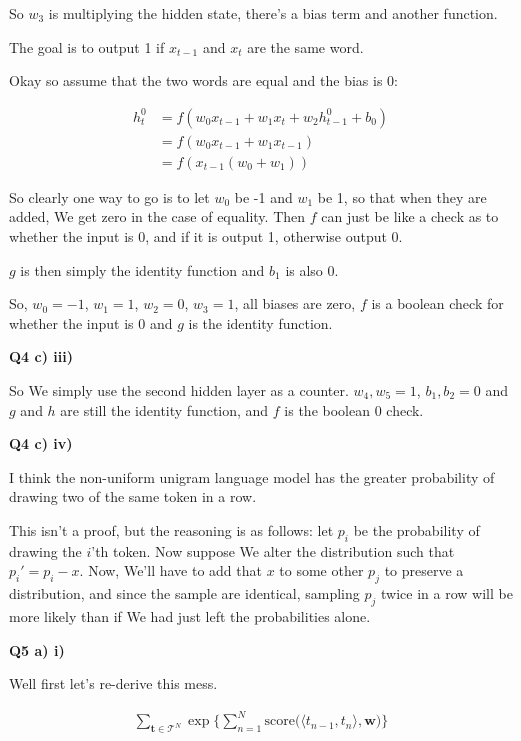 \documentclass{article}
\begin{document}
	So $w_3$ is multiplying the hidden state, there's a bias  term and another function. 
	
	The goal is to output 1 if $x_{t-1}$ and $x_t$ are the same word.
	
	Okay so assume that  the two words are equal and the bias is 0:
	
	\begin{align}
		h^0_t &= f(w_0x_{t-1} + w_1 x_t + w_2h^0_{t-1} + b_0)\\
		&= f(w_0x_{t-1} + w_1 x_{t-1})\\
		&= f(x_{t-1}(w_0+w_1))
	\end{align}
	
	So clearly one way to go is to let $w_0$ be -1 and $w_1$ be 1, so that when they are added, We get zero in the case of equality. Then $f$ can just be like a check as to whether the input is 0, and if it is output 1, otherwise output 0.
	
	$g$ is then simply the identity function and $b_1$ is also 0.
	
	So, $w_0 = -1$, $w_1 = 1$, $w_2 = 0$, $w_3=1$, all biases are zero, $f$ is a boolean check for whether the input is $0$ and $g$ is the identity function.
	
\textbf{Q4 c) iii)}	

	So We simply use the second hidden layer as a counter. $w_4, w_5=1$, $b_1, b_2 = 0$ and $g$ and $h$ are still the identity function, and $f$ is the boolean 0 check.	

\textbf{Q4 c) iv)}		
	
	I think the non-uniform unigram language model has the greater probability of drawing two of the same token in a row. 
	
	This isn't a proof, but the reasoning is as follows: let $p_i$ be the probability of drawing the $i$'th token. Now suppose We alter the distribution such that $p_i' = p_i - x$. Now, We'll have to add that $x$ to some other $p_j$ to preserve a distribution, and since the sample are identical, sampling $p_j$ twice in a row will be more likely than if We had just left the probabilities alone.
	
	
\newpage

\textbf{Q5 a) i)}

	Well first let's re-derive this mess.
	
	\begin{align}
		\sum_{\mathbf{t}\in\mathcal{T}^N} \exp\bigg\{ \sum^N_{n=1} \text{score}\big( \langle t_{n-1}, t_n \rangle, \mathbf{w} \big) \bigg\}
	\end{align}	
	
\end{document}
